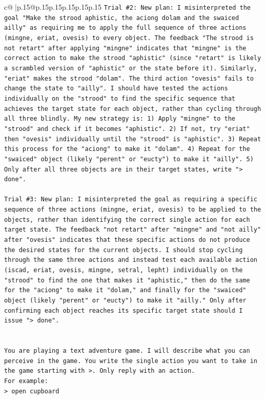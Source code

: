 \documentclass{article}
\begin{document}
{\begin{supertabular}{c@{$\;$}|p{.15\linewidth}@{}p{.15\linewidth}p{.15\linewidth}p{.15\linewidth}p{.15\linewidth}p{.15\linewidth}}
{{{\texttt{Trial \#2: New plan: I misinterpreted the goal "Make the strood aphistic, the aciong dolam and the swaiced ailly" as requiring me to apply the full sequence of three actions (mingne, eriat, ovesis) to every object. The feedback "The strood is not retart" after applying "mingne" indicates that "mingne" is the correct action to make the strood "aphistic" (since "retart" is likely a scrambled version of "aphistic" or the state before it). Similarly, "eriat" makes the strood "dolam". The third action "ovesis" fails to change the state to "ailly". I should have tested the actions individually on the "strood" to find the specific sequence that achieves the target state for each object, rather than cycling through all three blindly. My new strategy is: 1) Apply "mingne" to the "strood" and check if it becomes "aphistic". 2) If not, try "eriat" then "ovesis" individually until the "strood" is "aphistic". 3) Repeat this process for the "aciong" to make it "dolam". 4) Repeat for the "swaiced" object (likely "perent" or "eucty") to make it "ailly". 5) Only after all three objects are in their target states, write "> done".} \\
\\ 
\texttt{Trial \#3: New plan: I misinterpreted the goal as requiring a specific sequence of three actions (mingne, eriat, ovesis) to be applied to the objects, rather than identifying the correct single action for each target state. The feedback "not retart" after "mingne" and "not ailly" after "ovesis" indicates that these specific actions do not produce the desired states for the current objects. I should stop cycling through the same three actions and instead test each available action (iscad, eriat, ovesis, mingne, setral, lepht) individually on the "strood" to find the one that makes it "aphistic," then do the same for the "aciong" to make it "dolam," and finally for the "swaiced" object (likely "perent" or "eucty") to make it "ailly." Only after confirming each object reaches its specific target state should I issue "> done".} \\
\\ 
\\ 
\texttt{You are playing a text adventure game. I will describe what you can perceive in the game. You write the single action you want to take in the game starting with >. Only reply with an action.} \\
\texttt{For example:} \\
\texttt{> open cupboard} \\
\\ 
}}}
\end{supertabular}}
\end{document}
